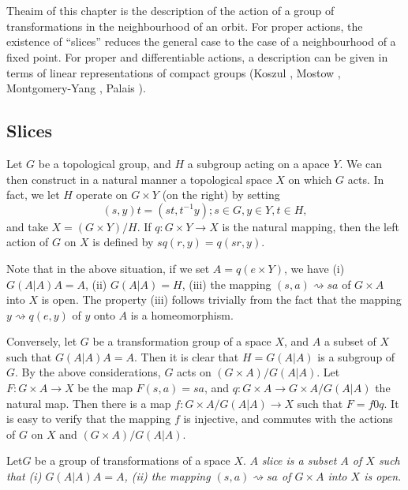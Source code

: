 \chapter{}\label{chap2}%
 
 The\pageoriginale aim of this chapter is the description of the
 action of a group  of transformations in the neighbourhood of an
 orbit. For proper actions, the existence of ``slices'' reduces the
 general case to the case of a neighbourhood of a fixed point. For
 proper and differentiable actions, a description can be given in
 terms of linear representations of compact groups (Koszul \cite{key1}, Mostow
 \cite{key1}, Montgomery-Yang \cite{key1}, Palais \cite{key1}).  

\section{Slices}%
Let $G$ be a topological group, and $H$ a subgroup 
 acting on a apace $Y$. We can then construct in a natural manner a
 topological space $X$ on which $G$ acts. In fact, we let $H$ operate
 on $G \times Y$ (on the right) by setting 
  $$
 (s, y)t=(st, t^{-1}y); s \in G, y \in Y, t \in H,
 $$
 and take $X=(G \times Y)/ H$. If $q:G \times Y \to X$ is the natural
 mapping, then the left action of $G$ on $X$ is defined by $sq (r,
 y)=q(sr, y)$. 
  
 Note that in the above situation, if we set $A=q(e \times Y)$, we
 have (i) $G(A | A)A=A$, (ii) $G(A | A)=H$, (iii) the mapping $(s, a)
 \rightsquigarrow sa$ of $G \times A$ into $X$ is open. The property
 (iii) follows trivially from the fact that the mapping $y
 \rightsquigarrow q(e, y)$ of $y$ onto $A$ is a homeomorphism.  

 Conversely, let $G$ be a transformation group of a space $X$, and $A$
 a subset of $X$ such that $G(A | A)A=A$. Then it is clear that $H=G(A
 |A)$ is a subgroup of $G$. By the above considerations, $G$ acts on
 $(G \times A)/ G(A | A)$. Let $F:G \times A \to X$ be the map $F(s,
 a)=sa$, and $q:G \times A \to G \times A/ G(A | A)$ the natural
 map. Then there is a map $f : G \times A/ G(A |A) \to X$ such that
 $F=f 0 q$. It is easy to verify that the mapping $f$ is injective,
 and commutes with the actions of $G$ on $X$ and $(G \times A)/ G(A
 |A)$. 

\begin{defi*}
  Let\pageoriginale $G$ be a group of transformations of a space $X$. $A$
  \it{slice} is a subset $A$ of $X$ such that (i) $G(A |A)A=A$, (ii)
  the mapping $(s, a) \rightsquigarrow sa $ of $G \times A$ into $X$ is
  open.   
\end{defi*} 
 
